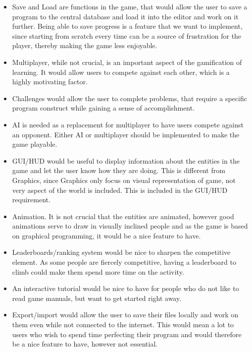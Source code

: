 \begin{itemize}
\item Save and Load are functions in the game, that would allow the user to save a program to the central database and load it into the editor and work 
on it further. Being able to save progress is a feature that we want to implement, since starting from scratch every time can be a source of 
frustration for the player, thereby making the game less enjoyable.

\item Multiplayer, while not crucial, is an important aspect of the gamification of learning. It would allow users to compete against each other, which 
is a highly motivating factor.

\item Challenges would allow the user to complete problems, that require a specific program construct while gaining a sense of accomplishment.

\item AI is needed as a replacement for multiplayer to have users compete against an opponent. Either AI or multiplayer should be implemented to make 
the game playable.

\item GUI/HUD would be useful to display information about the entities in the game and let the user know how they are doing. This is different from 
Graphics, since Graphics only focus on visual representation of game, not very aspect of the world is included. This is included in the GUI/HUD 
requirement.
\end{itemize}

\begin{itemize}
\item Animation. It is not crucial that the entities are animated, however good animations serve to draw in visually inclined people and as the game is 
based on graphical programming, it would be a nice feature to have.

\item Leaderboards/ranking system would be nice to sharpen the competitive element. As some people are fiercely competitive, having a leaderboard to 
climb could make them spend more time on the activity.

\item An interactive tutorial would be nice to have for people who do not like to read game manuals, but want to get started right away.

\item Export/import would allow the user to save their files locally and work on them even while not connected to the internet. This would mean a lot 
to users who wish to spend time perfecting their program and would therefore be a nice feature to have, however not essential.
\end{itemize}